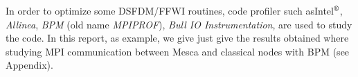 In order to optimize some DSFDM/FFWI routines, code profiler such asIntel$^{\mbox{\scriptsize{\textregistered}}}$, \textit{Allinea}, \textit{BPM} (old name \textit{MPIPROF}), \textit{Bull IO Instrumentation}, are used to study the code. In this report, as example, we give just give the results obtained where studying MPI communication between Mesca and classical nodes with BPM (see Appendix).
